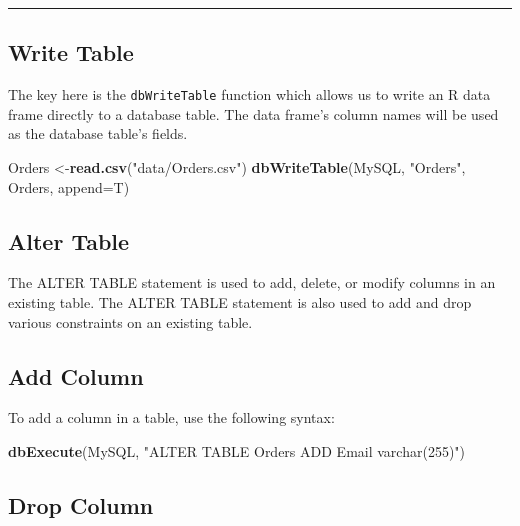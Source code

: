 \documentclass[
]{book}
\newenvironment{Shaded}{\begin{snugshade}}{\end{snugshade}}
\newcommand{\AttributeTok}[1]{\textcolor[rgb]{0.13,0.29,0.53}{#1}}
\newcommand{\FunctionTok}[1]{\textcolor[rgb]{0.13,0.29,0.53}{\textbf{#1}}}
\newcommand{\NormalTok}[1]{#1}
\newcommand{\OtherTok}[1]{\textcolor[rgb]{0.56,0.35,0.01}{#1}}
\newcommand{\StringTok}[1]{\textcolor[rgb]{0.31,0.60,0.02}{#1}}
\begin{document}
\begin{center}\rule{0.5\linewidth}{0.5pt}\end{center}

\hypertarget{write-table}{%
\subsection{Write Table}\label{write-table}}

The key here is the \texttt{dbWriteTable} function which allows us to write an R data frame directly to a database table. The data frame's column names will be used as the database table's fields.

\begin{Shaded}
\begin{Highlighting}[]
\NormalTok{Orders      }\OtherTok{\textless{}{-}}\FunctionTok{read.csv}\NormalTok{(}\StringTok{"data/Orders.csv"}\NormalTok{)  }
\FunctionTok{dbWriteTable}\NormalTok{(MySQL, }\StringTok{"Orders"}\NormalTok{, Orders, }\AttributeTok{append=}\NormalTok{T) }
\end{Highlighting}
\end{Shaded}

\hypertarget{alter-table}{%
\subsection{Alter Table}\label{alter-table}}

The ALTER TABLE statement is used to add, delete, or modify columns in an existing table. The ALTER TABLE statement is also used to add and drop various constraints on an existing table.

\hypertarget{add-column}{%
\subsection{Add Column}\label{add-column}}

To add a column in a table, use the following syntax:

\begin{Shaded}
\begin{Highlighting}[]
\FunctionTok{dbExecute}\NormalTok{(MySQL, }\StringTok{"ALTER TABLE Orders}
\StringTok{                 ADD Email varchar(255)"}\NormalTok{)}
\end{Highlighting}
\end{Shaded}

\hypertarget{drop-column}{%
\subsection{Drop Column}\label{drop-column}}
\end{document}
